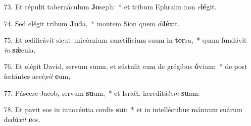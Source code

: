 73. Et répulit tabernáculum \textbf{Jo}seph:~*  et tribum Ephraim non \textit{e}\textbf{lé}git.\

74. Sed elégit tribum \textbf{Ju}da,~*  montem Sion quem \textit{di}\textbf{lé}xit.\

75. Et ædificávit sicut unicórnium sanctifícium suum in \textbf{ter}ra,~*  quam fundávit \textit{in} \textbf{sǽ}cula.\

76. Et elégit David, servum suum, et sústulit eum de grégibus \textbf{ó}vium:~*  de post fœtántes accé\textit{pit} \textbf{e}um,\

77. Páscere Jacob, servum \textbf{su}um,~*  et Israël, hereditá\textit{tem} \textbf{su}am:\

78. Et pavit eos in innocéntia cordis \textbf{su}i:~*  et in intelléctibus mánuum suárum dedú\textit{xit} \textbf{e}os.\

